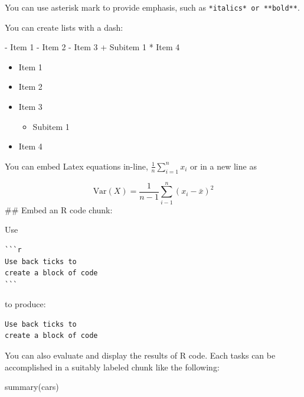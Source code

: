 \documentclass[
]{book}
\newenvironment{Shaded}{\begin{snugshade}}{\end{snugshade}}
\newcommand{\DecValTok}[1]{\textcolor[rgb]{0.00,0.00,0.81}{#1}}
\newcommand{\FunctionTok}[1]{\textcolor[rgb]{0.00,0.00,0.00}{#1}}
\newcommand{\NormalTok}[1]{#1}
\newcommand{\SpecialCharTok}[1]{\textcolor[rgb]{0.00,0.00,0.00}{#1}}
\providecommand{\tightlist}{%
  \setlength{\itemsep}{0pt}\setlength{\parskip}{0pt}}
\begin{document}
You can use asterisk mark to provide emphasis, such as \texttt{*italics*\ or\ **bold**}.

You can create lists with a dash:

\begin{Shaded}
\begin{Highlighting}[]
\SpecialCharTok{{-}}\NormalTok{ Item }\DecValTok{1}
\SpecialCharTok{{-}}\NormalTok{ Item }\DecValTok{2}
\SpecialCharTok{{-}}\NormalTok{ Item }\DecValTok{3}
  \SpecialCharTok{+}\NormalTok{ Subitem }\DecValTok{1}
\SpecialCharTok{*}\NormalTok{ Item }\DecValTok{4}
\end{Highlighting}
\end{Shaded}

\begin{itemize}
\tightlist
\item
  Item 1
\item
  Item 2
\item
  Item 3

  \begin{itemize}
  \tightlist
  \item
    Subitem 1
  \end{itemize}
\item
  Item 4
\end{itemize}

You can embed Latex equations in-line, \(\frac{1}{n} \sum_{i=1}^{n} x_{i}\) or in a new line as

\[\text{Var}(X) = \frac{1}{n-1}\sum_{i-1}^{n} (x_{i} - \bar{x})^2 \]
\#\# Embed an R code chunk:

Use

\begin{verbatim}
```r
Use back ticks to 
create a block of code
```
\end{verbatim}

to produce:

\begin{verbatim}
Use back ticks to 
create a block of code
\end{verbatim}

You can also evaluate and display the results of R code. Each tasks can be accomplished in a suitably labeled chunk like the following:

\begin{Shaded}
\begin{Highlighting}[]
\FunctionTok{summary}\NormalTok{(cars)}
\end{Highlighting}
\end{Shaded}
\end{document}
